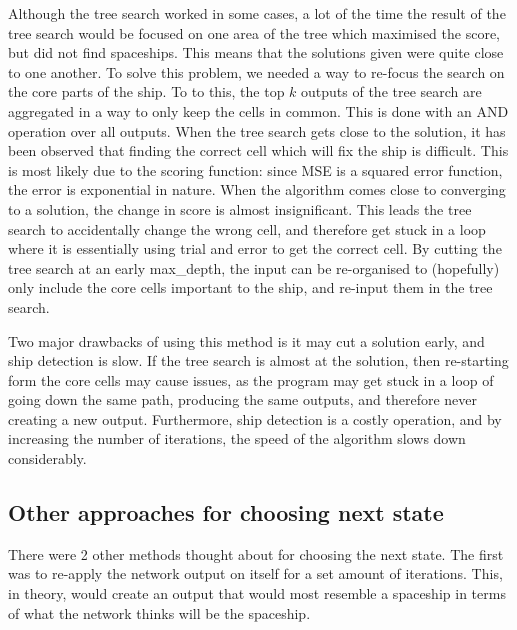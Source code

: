 \documentclass{l4proj}
\begin{document}
Although the tree search worked in some cases, a lot of the time the result of the tree search would be focused on one area of the tree which maximised the score, but did not find spaceships. This means that the solutions given were quite close to one another. To solve this problem, we needed a way to re-focus the search on the core parts of the ship. To to this, the top $k$ outputs of the tree search are aggregated in a way to only keep the cells in common. This is done with an AND operation over all outputs. When the tree search gets close to the solution, it has been observed that finding the correct cell which will fix the ship is difficult. This is most likely due to the scoring function: since MSE is a squared error function, the error is exponential in nature. When the algorithm comes close to converging to a solution, the change in score is almost insignificant. This leads the tree search to accidentally change the wrong cell, and therefore get stuck in a loop where it is essentially using trial and error to get the correct cell. By cutting the tree search at an early max\_depth, the input can be re-organised to (hopefully) only include the core cells important to the ship, and re-input them in the tree search. 


Two major drawbacks of using this method is it may cut a solution early, and ship detection is slow. If the tree search is almost at the solution, then re-starting form the core cells may cause issues, as the program may get stuck in a loop of going down the same path, producing the same outputs, and therefore never creating a new output. Furthermore, ship detection is a costly operation, and by increasing the number of iterations, the speed of the algorithm slows down considerably.

\subsection{Other approaches for choosing next state}

There were 2 other methods thought about for choosing the next state. The first was to re-apply the network output on itself for a set amount of iterations. This, in theory, would create an output that would most resemble a spaceship in terms of what the network thinks will be the spaceship.
\end{document}
